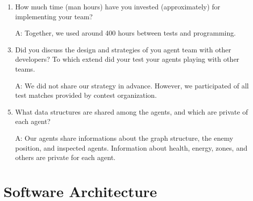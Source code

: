 \begin{enumerate}
\item How much time (man hours) have you invested (approximately) for implementing your team?
	\item[A:] Together, we used around 400 hours between tests and programming.\\
	
\item Did you discuss the design and strategies of you agent team with other developers? To which extend did your test your agents playing with other teams.
	\item[A:] We did not share our strategy in advance. However, we participated of all test matches provided by contest organization.\\	
	
\item What data structures are shared among the agents, and which are private of each agent?
	\item[A:] Our agents share informations about the graph structure, the enemy position, and inspected agents. Information about health, energy, zones, and others are private for each agent. \\
	
	
\end{enumerate}

\section{Software Architecture}

